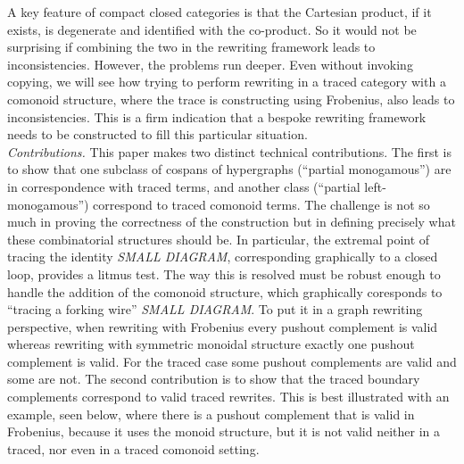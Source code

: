 A key feature of compact closed categories is that the Cartesian product, if it exists, is degenerate and identified with the co-product. So it would not be surprising if combining the two in the rewriting framework leads to inconsistencies. However, the problems run deeper. Even without invoking copying, we will see how trying to perform rewriting in a traced category with a comonoid structure, where the trace is constructing using Frobenius, also leads to inconsistencies. This is a firm indication that a bespoke rewriting framework needs to be constructed to fill this particular situation. 
\\[1.5ex]
\emph{Contributions.} This paper makes two distinct technical contributions. The first is to show that one subclass of cospans of hypergraphs (``partial monogamous'') are in correspondence with traced terms, and another class (``partial left-monogamous'') correspond to traced comonoid terms. The challenge is not so much in proving the correctness of the construction but in defining precisely what these combinatorial structures should be. In particular, the extremal point of tracing the identity \emph{SMALL DIAGRAM}, corresponding graphically to a closed loop, provides a litmus test. The way this is resolved must be robust enough to handle the addition of the comonoid structure, which graphically coresponds to ``tracing a forking wire'' \emph{SMALL DIAGRAM}. To put it in a graph rewriting perspective, when rewriting with Frobenius every pushout complement is valid whereas rewriting with symmetric monoidal structure exactly one pushout complement is valid. For the traced case some pushout complements are valid and some are not. 
The second contribution is to show that the traced boundary complements correspond to valid traced rewrites. This is best illustrated with an example, seen below, where there is a pushout complement that is valid in Frobenius, because it uses the monoid structure, but it is not valid neither in a traced, nor even in a traced comonoid setting. 

